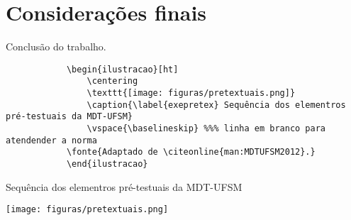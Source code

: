 \chapter{Considerações finais}

	\par Conclusão do trabalho. 

        \begin{verbatim}
    	    \begin{ilustracao}[ht]
        		\centering
        		\texttt{[image: figuras/pretextuais.png]}
        		\caption{\label{exepretex} Sequência dos elementros pré-testuais da MDT-UFSM}
        		\vspace{\baselineskip} %%% linha em branco para atendender a norma
    		\fonte{Adaptado de \citeonline{man:MDTUFSM2012}.}
    	    \end{ilustracao}
        \end{verbatim}
         
         \begin{ilustracao}[ht]
     	    \caption{\label{exepretex} Sequência dos elementros pré-testuais da MDT-UFSM}
	    \centering
	    \texttt{[image: figuras/pretextuais.png]}
	    \vspace{\baselineskip} %
         \end{ilustracao}